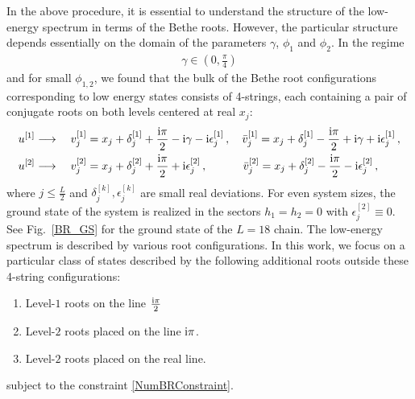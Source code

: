 \documentclass[12pt]{article}
\numberwithin{equation}{section}
\newcommand{\BR}[2]{u^{[#1]}_{#2}}
\newcommand{\BRv}[2]{v^{[#1]}_{#2}}
\newcommand{\BRvbar}[2]{\bar{v}^{[#1]}_{#2}}
\newcommand{\ri}{{\rm i}}
\begin{document}
	In the above procedure, it is essential to understand the structure of the low-energy spectrum in terms of the Bethe roots. However, the particular structure depends essentially on the domain of the parameters $\gamma$, $\phi_1$ and $\phi_2$. In the regime
	\begin{align}
		\gamma \in (0,\tfrac{\pi}{4}) \label{Parameter_Domain}
	\end{align}
	and for small $\phi_{1,2}$, we found that the bulk of the Bethe root configurations corresponding to low energy states consists of 4-strings, each containing a pair of conjugate roots on both levels centered at real $x_j$: 
	\begin{equation}
		\label{BR_GS_1}
		\begin{aligned}
			&\BR{1}{} \longrightarrow\quad \BRv{1}{j}=x_j+\delta^{[1]}_j+ \frac{\ri\pi}{2}-\ri\gamma-\ri\epsilon^{[1]}_j\,, \quad \BRvbar{1}{j}=x_j+\delta^{[1]}_j- \frac{\ri\pi}{2}+\ri\gamma+\ri\epsilon^{[1]}_j\,, \\
			&\BR{2}{} \longrightarrow  \quad  \BRv{2}{j}=x_j+\delta^{[2]}_j+\frac{\ri \pi}{2}+\ri\epsilon^{[2]}_j\,, \qquad\quad\, \BRvbar{2}{j}=x_j+\delta^{[2]}_j-\frac{\ri \pi}{2}-\ri\epsilon^{[2]}_j \,,
		\end{aligned}
	\end{equation}
	where $j\le \frac{L}{2}$ and $\delta^{[k]}_j,\epsilon^{[k]}_j$ are small real deviations. For even system sizes, the ground state of the system is realized in the sectors $h_1=h_2=0$ with $\epsilon^{[2]}_j\equiv 0 $. See  Fig.~\ref{BR_GS} for the ground state of the $L=18$ chain. The low-energy spectrum is described by various root configurations. In this work, we focus on a particular class of states described by the following additional roots outside these 4-string configurations:
	\begin{enumerate}[label=\roman*)]
		\item \label{i} Level-$1$ roots on the line $\frac{\ri \pi}{2}$ 
		\item \label{ii} Level-$2$ roots placed on the line $\ri \pi$. 
		\item \label{iii} Level-$2$ roots placed on the real line. 
	\end{enumerate}
	subject to the constraint \eqref{NumBRConstraint}.
	
\end{document}
